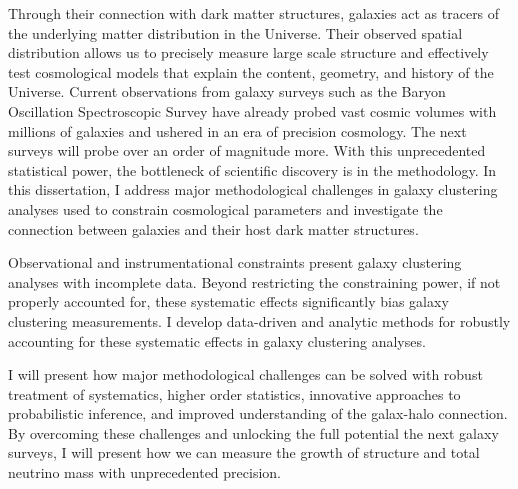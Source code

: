 Through their connection with dark matter structures, galaxies act as 
tracers of the underlying matter distribution in the Universe. Their 
observed spatial distribution allows us to precisely measure large scale 
structure and effectively test cosmological models that explain the content, 
geometry, and history of the Universe. Current observations from galaxy 
surveys such as the Baryon Oscillation Spectroscopic Survey
have already probed vast cosmic volumes with millions of galaxies 
and ushered in an era of precision cosmology. The next surveys will 
probe over an order of magnitude more. With this unprecedented statistical 
power, the bottleneck of scientific discovery is in the methodology.
In this dissertation, I address major methodological challenges in 
galaxy clustering analyses used to constrain cosmological parameters 
and investigate the connection between galaxies and their host dark 
matter structures.

Observational and instrumentational constraints present galaxy 
clustering analyses with incomplete data. Beyond restricting the 
constraining power, if not properly accounted for, these systematic 
effects significantly bias galaxy clustering measurements. I develop 
data-driven and analytic methods for robustly accounting for these
systematic effects in galaxy clustering analyses. 



I will present how major methodological challenges can be solved with robust 
treatment of systematics, higher order statistics, innovative approaches to 
probabilistic inference, and improved understanding of the galax-halo connection. 
By overcoming these challenges and unlocking the full potential the next galaxy 
surveys, I will present how we can measure the growth of structure and total 
neutrino mass with unprecedented precision.


